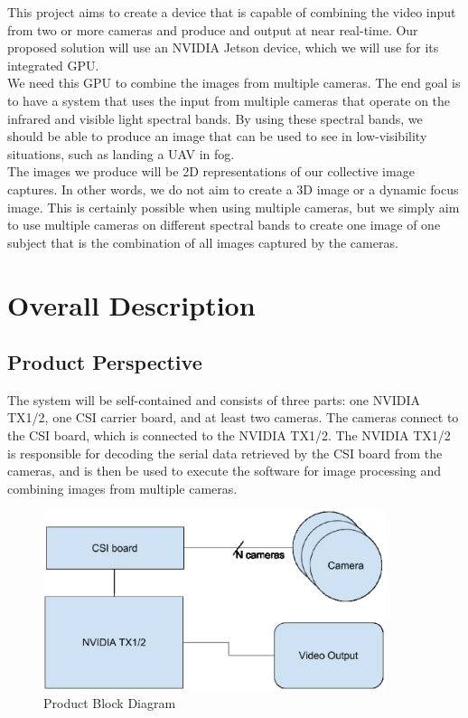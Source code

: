 \documentclass[letterpaper,10pt,serif,draftclsnofoot,onecolumn,compsoc,titlepage]{IEEEtran}
\begin{document}
This project aims to create a device that is capable of combining the video input from 
two or more cameras and produce and output at near real-time. Our proposed solution 
will use an NVIDIA Jetson device, which we will use for its integrated GPU.\\

We need this GPU to combine the images from multiple cameras. The end goal is to have 
a system that uses the input from multiple cameras that operate on the infrared and 
visible light spectral bands. By using these spectral bands, we should be able to 
produce an image that can be used to see in low-visibility situations, such as landing 
a UAV in fog.\\

The images we produce will be 2D representations of our collective image captures. In 
other words, we do not aim to create a 3D image or a dynamic focus image. This is 
certainly possible when using multiple cameras, but we simply aim to use multiple 
cameras on different spectral bands to create one image of one subject that is the 
combination of all images captured by the cameras.\\


\section{Overall Description}

\subsection{Product Perspective}

The system will be self-contained and consists of three parts: one NVIDIA TX1/2, 
one CSI carrier board, and at least two cameras. The cameras connect to the CSI board, 
which is connected to the NVIDIA TX1/2. The NVIDIA TX1/2 is responsible for decoding 
the serial data retrieved by the CSI board from the cameras, and is then be used to 
execute the software for image processing and combining images from multiple cameras.\\

\begin{figure}[H]
	\centering
	\label{fig:ProductBlockDiagram}
	\includegraphics[width=10cm]{images/diagram.eps}
	\caption{Product Block Diagram \label{overflow}}
\end{figure}
\end{document}
